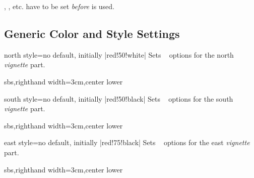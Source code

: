 \begin{marker}
, , etc. have to
be set \emph{before}  is used.
\end{marker}



\subsection{Generic Color and Style Settings}\label{subsec:vignettestyle}

\begin{vigTcbKey}[][doc new=2016-04-22]{north style}{=}{no default, initially |red!50!white|}
  Sets \tikzname\  options for the north \emph{vignette} part.
\begin{dispExample*}{sbs,righthand width=3cm,center lower}
\end{dispExample*}
\end{vigTcbKey}

\begin{vigTcbKey}[][doc new=2016-04-22]{south style}{=}{no default, initially |red!50!black|}
  Sets \tikzname\  options for the south \emph{vignette} part.
\begin{dispExample*}{sbs,righthand width=3cm,center lower}
\end{dispExample*}
\end{vigTcbKey}


\begin{vigTcbKey}[][doc new=2016-04-22]{east style}{=}{no default, initially |red!75!black|}
  Sets \tikzname\  options for the east \emph{vignette} part.
\begin{dispExample*}{sbs,righthand width=3cm,center lower}
\end{dispExample*}
\end{vigTcbKey}

\clearpage

